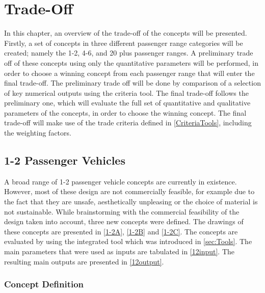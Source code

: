 \newpage
\chapter{Trade-Off}
\label{ch-tradeoff}


In this chapter, an overview of the trade-off of the concepts will be presented. Firstly, a set of concepts in three different passenger range categories will be created; namely the 1-2, 4-6, and 20 plus passenger ranges. A preliminary trade off of these concepts using only the quantitative parameters will be performed, in order to choose a winning concept from each passenger range that will enter the final trade-off. The preliminary trade off will be done by comparison of a selection of key numerical outputs using the criteria tool. The final trade-off follows the preliminary one, which will evaluate the full set of quantitative and qualitative parameters of the concepts, in order to choose the winning concept. The final trade-off will make use of the trade criteria defined in \autoref{CriteriaTools}, including the weighting factors. 


\section{1-2 Passenger Vehicles}
A broad range of 1-2 passenger vehicle concepts are currently in existence. However, most of these design are not commercially feasible, for example due to the fact that they are unsafe, aesthetically unpleasing or the choice of material is not sustainable. While brainstorming with the commercial feasibility of the design taken into account, three new concepts were defined. The drawings of these concepts are presented in \autoref{1-2A}, \autoref{1-2B} and \autoref{1-2C}. The concepts are evaluated by using the integrated tool which was introduced in \autoref{sec:Tools}. The main parameters that were used as inputs are tabulated in \autoref{12input}. The resulting main outputs are presented in \autoref{12output}. 

\subsection{Concept Definition}

